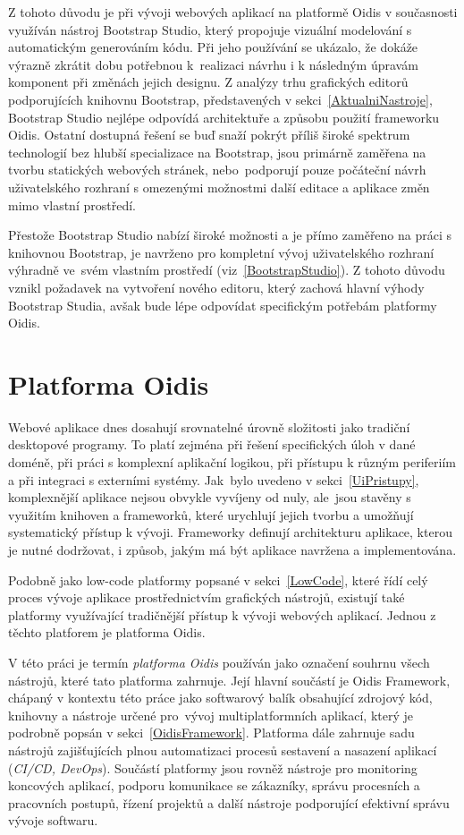 Z tohoto důvodu je při vývoji webových aplikací na platformě Oidis v současnosti využíván nástroj Bootstrap Studio, který propojuje vizuální modelování s automatickým generováním kódu. Při jeho používání se ukázalo, že dokáže výrazně zkrátit dobu potřebnou k~realizaci návrhu i k následným úpravám komponent při změnách jejich designu. Z analýzy trhu grafických editorů podporujících knihovnu Bootstrap, představených v sekci~\ref{AktualniNastroje}, Bootstrap Studio nejlépe odpovídá architektuře a způsobu použití frameworku Oidis. Ostatní dostupná řešení se buď snaží pokrýt příliš široké spektrum technologií bez hlubší specializace na Bootstrap, jsou primárně zaměřena na tvorbu statických webových stránek, nebo~podporují pouze počáteční návrh uživatelského rozhraní s omezenými možnostmi další editace a aplikace změn mimo vlastní prostředí.

Přestože Bootstrap Studio nabízí široké možnosti a je přímo zaměřeno na práci s knihovnou Bootstrap, je navrženo pro kompletní vývoj uživatelského rozhraní výhradně ve~svém vlastním prostředí (viz~\ref{BootstrapStudio}). Z tohoto důvodu vznikl požadavek na vytvoření nového editoru, který zachová hlavní výhody Bootstrap Studia, avšak bude lépe odpovídat specifickým potřebám platformy Oidis.

\chapter{Platforma Oidis} 
\label{Oidis}
Webové aplikace dnes dosahují srovnatelné úrovně složitosti jako tradiční desktopové programy. To platí zejména při řešení specifických úloh v dané doméně, při práci s komplexní aplikační logikou, při přístupu k různým periferiím a při integraci s externími systémy. Jak~bylo uvedeno v sekci~\ref{UiPristupy}, komplexnější aplikace nejsou obvykle vyvíjeny od nuly, ale~jsou stavěny s využitím knihoven a frameworků, které urychlují jejich tvorbu a umožňují systematický přístup k vývoji. Frameworky definují architekturu aplikace, kterou je nutné dodržovat, i způsob, jakým má být aplikace navržena a implementována.

Podobně jako low-code platformy popsané v sekci~\ref{LowCode}, které řídí celý proces vývoje aplikace prostřednictvím grafických nástrojů, existují také platformy využívající tradičnější přístup k vývoji webových aplikací. Jednou z těchto platforem je platforma Oidis.

V této práci je termín \textit{platforma Oidis} používán jako označení souhrnu všech nástrojů, které tato platforma zahrnuje. Její hlavní součástí je Oidis Framework, chápaný v kontextu této práce jako softwarový balík obsahující zdrojový kód, knihovny a nástroje určené pro~vývoj multiplatformních aplikací, který je podrobně popsán v sekci~\ref{OidisFramework}. Platforma dále zahrnuje sadu nástrojů zajišťujících plnou automatizaci procesů sestavení a nasazení aplikací (\textit{CI/CD, DevOps}). Součástí platformy jsou rovněž nástroje pro monitoring koncových aplikací, podporu komunikace se zákazníky, správu procesních a pracovních postupů, řízení projektů a další nástroje podporující efektivní správu vývoje softwaru.

